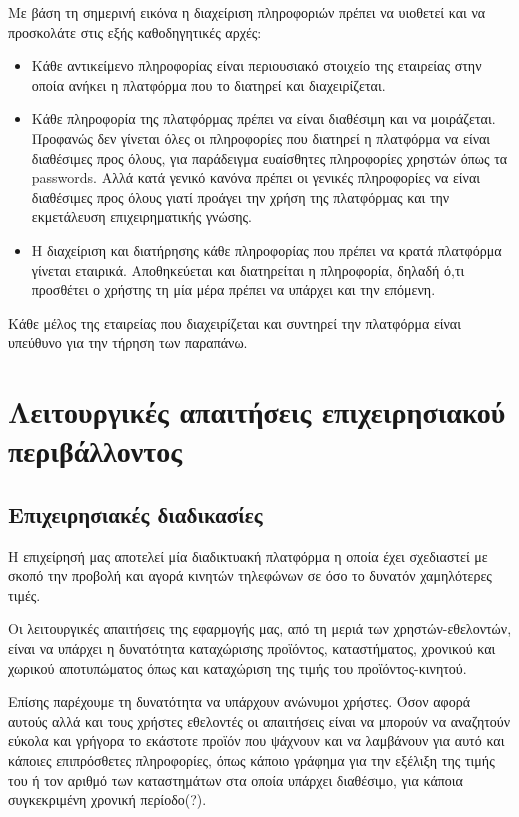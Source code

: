 \documentclass[12pt, oneside, a4paper]{report}
\begin{document}
\hspace{0.6cm}Με βάση τη σημερινή εικόνα η διαχείριση πληροφοριών πρέπει να υιοθετεί και να προσκολάτε στις εξής καθοδηγητικές αρχές:
\begin{itemize}
 \item Κάθε αντικείμενο πληροφορίας είναι περιουσιακό στοιχείο της εταιρείας στην οποία ανήκει η πλατφόρμα που το διατηρεί και διαχειρίζεται.
 \item Κάθε πληροφορία της πλατφόρμας πρέπει να είναι διαθέσιμη και να μοιράζεται. Προφανώς δεν γίνεται όλες οι πληροφορίες που διατηρεί η πλατφόρμα να είναι διαθέσιμες προς όλους, για παράδειγμα ευαίσθητες πληροφορίες χρηστών όπως τα passwords. Αλλά κατά γενικό κανόνα πρέπει οι γενικές πληροφορίες να είναι διαθέσιμες προς όλους γιατί προάγει την χρήση της πλατφόρμας και την εκμετάλευση επιχειρηματικής γνώσης.
 \item Η διαχείριση και διατήρησης κάθε πληροφορίας που πρέπει να κρατά πλατφόρμα γίνεται εταιρικά. Αποθηκεύεται και διατηρείται η πληροφορία, δηλαδή ό,τι προσθέτει ο χρήστης τη μία μέρα πρέπει να υπάρχει και την επόμενη.
\end{itemize}

\hspace{0.6cm}Κάθε μέλος της εταιρείας που διαχειρίζεται και συντηρεί την πλατφόρμα είναι υπεύθυνο για την τήρηση των παραπάνω.


\section{Λειτουργικές απαιτήσεις επιχειρησιακού περιβάλλοντος}

\subsection{Επιχειρησιακές διαδικασίες}
\hspace{0.6cm}Η επιχείρησή μας αποτελεί μία διαδικτυακή πλατφόρμα η οποία έχει σχεδιαστεί με σκοπό την προβολή και αγορά κινητών τηλεφώνων σε όσο το δυνατόν χαμηλότερες τιμές.

\hspace{0.6cm}Οι λειτουργικές απαιτήσεις της εφαρμογής μας, από τη μεριά των χρηστών-εθελοντών, είναι να υπάρχει η δυνατότητα καταχώρισης προϊόντος, καταστήματος, χρονικού και χωρικού αποτυπώματος όπως και καταχώριση της τιμής του προϊόντος-κινητού. 

\hspace{0.6cm}Επίσης παρέχουμε τη δυνατότητα να υπάρχουν ανώνυμοι χρήστες. Όσον αφορά αυτούς αλλά και τους χρήστες εθελοντές οι απαιτήσεις είναι να μπορούν να αναζητούν εύκολα και γρήγορα το εκάστοτε προϊόν που ψάχνουν και να λαμβάνουν για αυτό και κάποιες επιπρόσθετες πληροφορίες, όπως κάποιο γράφημα για την εξέλιξη της τιμής του ή τον αριθμό των καταστημάτων στα οποία υπάρχει διαθέσιμο, για κάποια συγκεκριμένη χρονική περίοδο(?).
\end{document}
